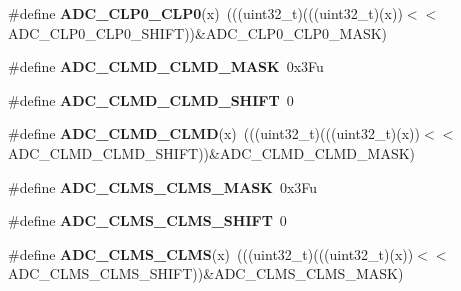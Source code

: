 \begin{DoxyCompactItemize}
\item 
\#define {\bfseries A\+D\+C\+\_\+\+C\+L\+P0\+\_\+\+C\+L\+P0}(x)~(((uint32\+\_\+t)(((uint32\+\_\+t)(x))$<$$<$A\+D\+C\+\_\+\+C\+L\+P0\+\_\+\+C\+L\+P0\+\_\+\+S\+H\+I\+FT))\&A\+D\+C\+\_\+\+C\+L\+P0\+\_\+\+C\+L\+P0\+\_\+\+M\+A\+SK)\hypertarget{group__ADC__Register__Masks_ga8ec1b8f6f0baa869f77385865e51a20d}{}\label{group__ADC__Register__Masks_ga8ec1b8f6f0baa869f77385865e51a20d}

\item 
\#define {\bfseries A\+D\+C\+\_\+\+C\+L\+M\+D\+\_\+\+C\+L\+M\+D\+\_\+\+M\+A\+SK}~0x3\+Fu\hypertarget{group__ADC__Register__Masks_ga45c4117ad9fba213c3d338cf6280cb75}{}\label{group__ADC__Register__Masks_ga45c4117ad9fba213c3d338cf6280cb75}

\item 
\#define {\bfseries A\+D\+C\+\_\+\+C\+L\+M\+D\+\_\+\+C\+L\+M\+D\+\_\+\+S\+H\+I\+FT}~0\hypertarget{group__ADC__Register__Masks_ga872bf108b50c6dd439ddc1294f104fe5}{}\label{group__ADC__Register__Masks_ga872bf108b50c6dd439ddc1294f104fe5}

\item 
\#define {\bfseries A\+D\+C\+\_\+\+C\+L\+M\+D\+\_\+\+C\+L\+MD}(x)~(((uint32\+\_\+t)(((uint32\+\_\+t)(x))$<$$<$A\+D\+C\+\_\+\+C\+L\+M\+D\+\_\+\+C\+L\+M\+D\+\_\+\+S\+H\+I\+FT))\&A\+D\+C\+\_\+\+C\+L\+M\+D\+\_\+\+C\+L\+M\+D\+\_\+\+M\+A\+SK)\hypertarget{group__ADC__Register__Masks_ga8066beb7ed493b4d9964fffd3cdefd7a}{}\label{group__ADC__Register__Masks_ga8066beb7ed493b4d9964fffd3cdefd7a}

\item 
\#define {\bfseries A\+D\+C\+\_\+\+C\+L\+M\+S\+\_\+\+C\+L\+M\+S\+\_\+\+M\+A\+SK}~0x3\+Fu\hypertarget{group__ADC__Register__Masks_ga108adc09b24001dddfd498e14213fea6}{}\label{group__ADC__Register__Masks_ga108adc09b24001dddfd498e14213fea6}

\item 
\#define {\bfseries A\+D\+C\+\_\+\+C\+L\+M\+S\+\_\+\+C\+L\+M\+S\+\_\+\+S\+H\+I\+FT}~0\hypertarget{group__ADC__Register__Masks_gabe0e92adb89c86d0523958a947288808}{}\label{group__ADC__Register__Masks_gabe0e92adb89c86d0523958a947288808}

\item 
\#define {\bfseries A\+D\+C\+\_\+\+C\+L\+M\+S\+\_\+\+C\+L\+MS}(x)~(((uint32\+\_\+t)(((uint32\+\_\+t)(x))$<$$<$A\+D\+C\+\_\+\+C\+L\+M\+S\+\_\+\+C\+L\+M\+S\+\_\+\+S\+H\+I\+FT))\&A\+D\+C\+\_\+\+C\+L\+M\+S\+\_\+\+C\+L\+M\+S\+\_\+\+M\+A\+SK)\hypertarget{group__ADC__Register__Masks_ga83a90dcd2d54b25cc64ad18d6b9d4f07}{}\label{group__ADC__Register__Masks_ga83a90dcd2d54b25cc64ad18d6b9d4f07}


\end{DoxyCompactItemize}
